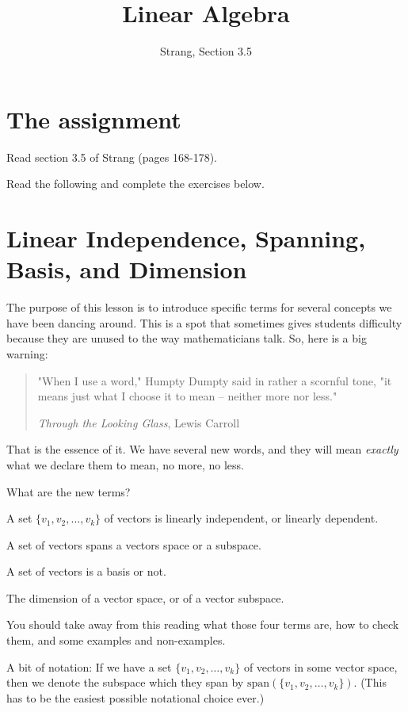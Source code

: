 \documentclass[11pt]{amsart}
\theoremstyle{definition}
\begin{document}
\title{Linear Algebra}
\author{Strang, Section 3.5}
\maketitle

\section{The assignment}
\begin{compactitem}
\item Read section 3.5 of Strang (pages 168-178).
\item Read the following and complete the exercises below.
\end{compactitem}


\section{Linear Independence, Spanning, Basis, and Dimension}

The purpose of this lesson is to introduce specific terms for several concepts we have been dancing around. This is a spot that sometimes gives students difficulty because they are unused to the way mathematicians talk. So, here is a big warning:
\begin{quotation}
"When I use a word," Humpty Dumpty said in rather a scornful tone, "it means just what I choose it to mean -- neither more nor less."

\hfill\emph{Through the Looking Glass}, Lewis Carroll
\end{quotation}
That is the essence of it. We have several new words, and they will mean \emph{exactly} what we declare them to mean, no more, no less.

What are the new terms?
\begin{compactitem}
\item A set $\{v_1, v_2, \ldots, v_k\}$ of vectors is linearly independent, or linearly dependent.
\item A set of vectors spans a vectors space or a subspace.
\item A set of vectors is a basis or not.
\item The dimension of a vector space, or of a vector subspace.
\end{compactitem}
You should take away from this reading what those four terms are, how to check them, and some examples and non-examples.


A bit of notation: If we have a set $\{ v_1, v_2, \dots, v_k\}$ of vectors in some vector space, then we denote the subspace which they span by $\mathrm{span}(\{v_1, v_2, \ldots, v_k\})$. (This has to be the easiest possible notational choice ever.)
\end{document}
